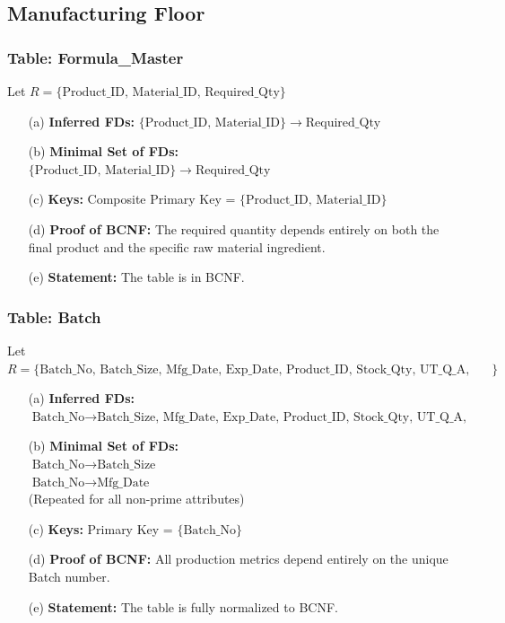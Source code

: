 \documentclass[12pt, a4paper]{article}
\begin{document}
\subsection{Manufacturing Floor}

\subsubsection{Table: Formula\_Master}
Let $R = \{ \text{Product\_ID, Material\_ID, Required\_Qty} \}$
\begin{enumerate}
    \item[(a)] \textbf{Inferred FDs:} $\{ \text{Product\_ID, Material\_ID} \} \rightarrow \text{Required\_Qty}$
    \item[(b)] \textbf{Minimal Set of FDs:} 
    \\ $\{ \text{Product\_ID, Material\_ID} \} \rightarrow \text{Required\_Qty}$
    \item[(c)] \textbf{Keys:} Composite Primary Key = $\{ \text{Product\_ID, Material\_ID} \}$
    \item[(d)] \textbf{Proof of BCNF:} The required quantity depends entirely on both the final product and the specific raw material ingredient.
    \item[(e)] \textbf{Statement:} The table is in BCNF.
\end{enumerate}

\subsubsection{Table: Batch}
Let $R = \{ \text{Batch\_No, Batch\_Size, Mfg\_Date, Exp\_Date, Product\_ID, Stock\_Qty, UT\_Q\_A, Yield\_Percentage} \}$
\begin{enumerate}
    \item[(a)] \textbf{Inferred FDs:} $\text{Batch\_No} \rightarrow \text{Batch\_Size, Mfg\_Date, Exp\_Date, Product\_ID, Stock\_Qty, UT\_Q\_A, Yield\_Percentage}$
    \item[(b)] \textbf{Minimal Set of FDs:} 
    \\ $\text{Batch\_No} \rightarrow \text{Batch\_Size}$
    \\ $\text{Batch\_No} \rightarrow \text{Mfg\_Date}$
    \\ (Repeated for all non-prime attributes)
    \item[(c)] \textbf{Keys:} Primary Key = $\{ \text{Batch\_No} \}$
    \item[(d)] \textbf{Proof of BCNF:} All production metrics depend entirely on the unique Batch number.
    \item[(e)] \textbf{Statement:} The table is fully normalized to BCNF.
\end{enumerate}
\end{document}
